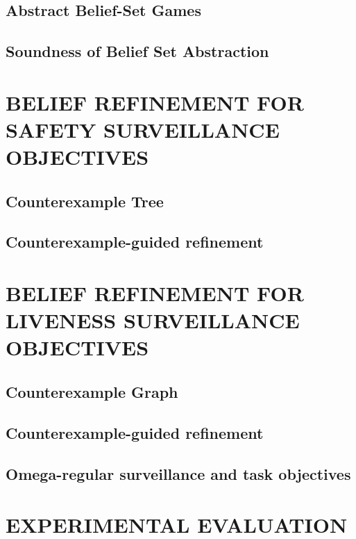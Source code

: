 \documentclass[letterpaper, 10 pt, conference]{ieeeconf}  %
\begin{document}
\subsection{Abstract Belief-Set Games}

\subsection{Soundness of Belief Set Abstraction}




\section{BELIEF REFINEMENT FOR SAFETY SURVEILLANCE OBJECTIVES}
\subsection{Counterexample Tree}

\subsection{Counterexample-guided refinement}



\section{BELIEF REFINEMENT FOR LIVENESS SURVEILLANCE OBJECTIVES}
\subsection{Counterexample Graph}

\subsection{Counterexample-guided refinement}

\subsection{Omega-regular surveillance and task objectives}



\section{EXPERIMENTAL EVALUATION}

\end{document}
